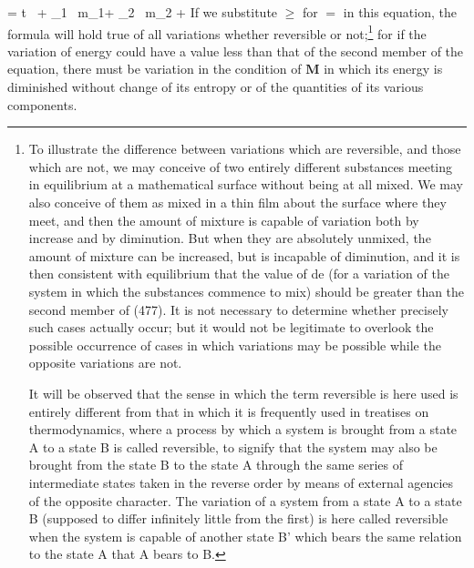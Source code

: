 \documentclass[12pt]{memoir}
\begin{document}
{\eqs \delta \epsilon = t \, \delta \eta + \mu_1 \, \delta m_1+ \mu_2 \, \delta m_2 +  \label{477} \eqe
If we substitute $\geq$ for $=$ in this equation, the formula will hold true of all variations whether reversible or not;\footnote{To illustrate the difference between variations which are reversible, and those which are not, we may conceive of two entirely different substances meeting in equilibrium at a mathematical surface without being at all mixed. We may also conceive of them as mixed in a thin film about the surface where they meet, and then the amount of mixture is capable of variation both by increase and by diminution. But when they are absolutely unmixed, the amount of mixture can be increased, but is incapable of diminution, and it is then consistent with equilibrium that the value of de (for a variation of the system in which the substances commence to mix) should be greater than the second member of (477). It is not necessary to determine whether precisely such cases actually occur; but it would not be legitimate to overlook the possible occurrence of cases in which variations may be possible while the opposite variations are not.\par
It will be observed that the sense in which the term reversible is here used is entirely different from that in which it is frequently used in treatises on thermodynamics, where a process by which a system is brought from a state A to a state B is called reversible, to signify that the system may also be brought from the state B to the state A through the same series of intermediate states taken in the reverse order by means of external agencies of the opposite character. The variation of a system from a state A to a state B (supposed to differ infinitely little from the first) is here called reversible when the system is capable of another state B' which bears the same relation to the state A that A bears to B.} %
for if the variation of energy could have a value less than that of the second member of the equation, there must be variation in the condition of $\mathbf{M}$ in which its energy is diminished without change of its entropy or of the quantities of its various components.


}
\end{document}
